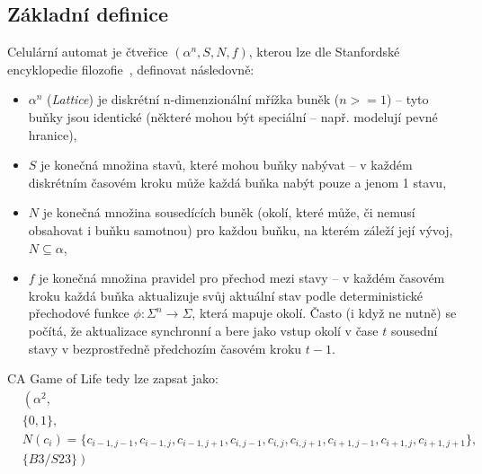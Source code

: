 \subsection*{Základní definice }
Celulární automat je čtveřice ${(\alpha^{n}, S, N, f)}$, kterou lze dle Stanfordské encyklopedie filozofie~\cite{sep-cellular-automata}, definovat následovně:
\begin{itemize}
    \item ${ \alpha^{n} }$ (\textit{Lattice}) je diskrétní n-dimenzionální mřížka buněk (${ n >= 1 }$) -- tyto buňky jsou identické (některé mohou být speciální -- např. modelují pevné hranice), 
    \item ${ S }$ je konečná množina stavů, které mohou buňky nabývat -- v každém diskrétním časovém kroku může každá buňka nabýt pouze a jenom 1 stavu, 
    \item ${ N }$ je konečná množina sousedících buněk (okolí, které může, či nemusí obsahovat i buňku samotnou) pro každou buňku, na kterém záleží její vývoj, ${ N \subseteq \alpha }$,
    \item ${ f }$ je konečná množina pravidel pro přechod mezi stavy -- v každém časovém kroku každá buňka aktualizuje svůj aktuální stav podle deterministické přechodové funkce $\phi : \Sigma^n \rightarrow \Sigma$, která mapuje okolí. Často (i když ne nutně) se počítá, že aktualizace synchronní a bere jako vstup okolí v čase $t$ sousední stavy v bezprostředně předchozím časovém kroku $t-1$.
\end{itemize}
CA Game of Life tedy lze zapsat jako:
\begin{equation*}
\begin{split}
    & \left( \alpha^{2}, \right. \\
    & \left. \{0, 1\}, \right. \\
    & \left. N(c_i) = \{ c_{i-1,j-1}, c_{i-1,j}, c_{i-1,j+1}, c_{i,j-1}, c_{i,j}, c_{i,j+1}, c_{i+1,j-1}, c_{i+1,j}, c_{i+1,j+1} \}, \right. \\
    & \left. \{B3/S23\} \right)
\end{split}
\end{equation*}

